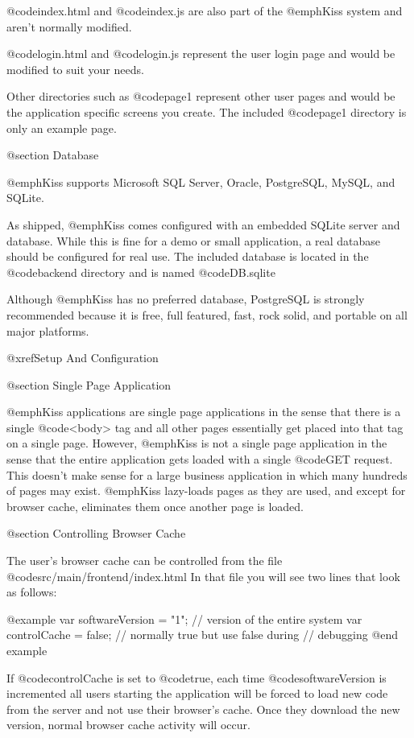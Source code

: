 @code{index.html} and @code{index.js} are also part of the @emph{Kiss}
system and aren't normally modified.

@code{login.html} and @code{login.js} represent the user login page
and would be modified to suit your needs.

Other directories such as @code{page1} represent other user pages and
would be the application specific screens you create.  The included
@code{page1} directory is only an example page.

@section Database

@emph{Kiss} supports Microsoft SQL Server, Oracle, PostgreSQL, MySQL, and
SQLite.

As shipped, @emph{Kiss} comes configured with an embedded SQLite
server and database.  While this is fine for a demo or small
application, a real database should be configured for real use.
The included database is located in the @code{backend} directory
and is named @code{DB.sqlite}

Although @emph{Kiss} has no preferred database, PostgreSQL is strongly
recommended because it is free, full featured, fast, rock solid, and
portable on all major platforms.

@xref{Setup And Configuration}


@section Single Page Application

@emph{Kiss} applications are single page applications in the sense
that there is a single @code{<body>} tag and all other pages
essentially get placed into that tag on a single page.  However,
@emph{Kiss} is not a single page application in the sense that the
entire application gets loaded with a single @code{GET} request.  This
doesn't make sense for a large business application in which many
hundreds of pages may exist.  @emph{Kiss} lazy-loads pages as they are
used, and except for browser cache, eliminates them once another page
is loaded.

@section Controlling Browser Cache

The user's browser cache can be controlled from the file
@code{src/main/frontend/index.html} In that file you will see two lines
that look as follows:

@example
var softwareVersion = "1";  // version of the entire system
var controlCache = false;   // normally true but use false during 
                            // debugging
@end example

If @code{controlCache} is set to @code{true}, each time @code{softwareVersion}
is incremented all users starting the application will be forced to
load new code from the server and not use their browser's cache.  Once
they download the new version, normal browser cache activity will
occur.


